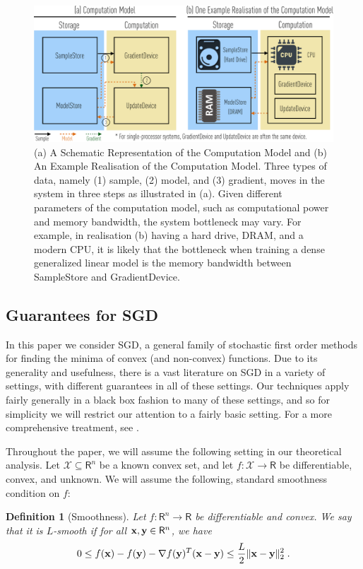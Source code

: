 \documentclass{article}
\newcommand{\R}{\mathsf{R}}
\def\x{{\bf x}}
\def\y{{\bf y}}
\newtheorem{definition}{Definition}
\begin{document}
\begin{figure}[t]
\centering   
\includegraphics[scale=0.4]{compmodel-pdfcrop}
\caption{(a) A Schematic Representation of the Computation Model and (b) An Example Realisation
of the Computation Model. Three types of
data, namely (1) sample, (2) model, and (3)
gradient, moves in the system in three
steps as illustrated in (a). Given
different parameters of the computation model,
such as computational power and memory bandwidth, the system bottleneck may
vary. For example, in 
realisation (b) having a hard drive, DRAM, and a
modern CPU, it is likely that the  bottleneck when training 
a dense generalized linear model is the
memory bandwidth between SampleStore
and GradientDevice.}
\label{fig:model}
\end{figure}






%   
%    

\subsection{Guarantees for SGD}
In this paper we consider SGD, a general family of stochastic first order methods for finding the minima of convex (and non-convex) functions.
Due to its generality and usefulness, there is a vast literature on SGD in a variety of settings, with different guarantees in all of these settings.
Our techniques apply fairly generally in a black box fashion to many of these settings, and so for simplicity we will restrict our attention to a fairly basic setting.
For a more comprehensive treatment, see \cite{Bubeck15}.

Throughout the paper, we will assume the following setting in our theoretical analysis.
Let $\mathcal{X} \subseteq \R^n$ be a known convex set, and let $f: \mathcal{X} \to \R$ be differentiable, convex, and unknown.
We will assume the following, standard smoothness condition on $f$:
\begin{definition}[Smoothness]
Let $f: \R^n \to \R$ be differentiable and convex.
We say that it is $L$-smooth if for all $\x, \y \in \R^n$, we have
\[0 \leq f(\x) - f(\y) - \nabla f(\y)^T (\x - \y) \leq \frac{L}{2} \| \x - \y \|_2^2 \; .\]
\end{definition}
\end{document}
